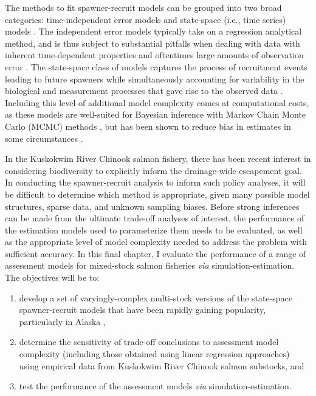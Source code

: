 \documentclass[12pt,]{book}
\theoremstyle{definition}
\theoremstyle{definition}
\theoremstyle{definition}
\theoremstyle{remark}
\begin{document}
The methods to fit spawner-recruit models can be grouped into two broad
categories: time-independent error models
\citep[i.e.,][]{clark-etal-2009} and state-space (i.e., time series)
models \citep{fleischman-etal-2013, su-peterman-2012}. The independent
error models typically take on a regression analytical method, and is
thus subject to substantial pitfalls when dealing with data with
inherent time-dependent properties and oftentimes large amounts of
observation error \citep{walters-martell-2004}. The state-space class of
models captures the process of recruitment events leading to future
spawners while simultaneously accounting for variability in the
biological and measurement processes that gave rise to the observed data
\citep{devalpine-hastings-2002, fleischman-etal-2013}. Including this
level of additional model complexity comes at computational costs, as
these models are well-suited for Bayesian inference with Markov Chain
Monte Carlo (MCMC) methods \citep[Ch. 4]{newman-etal-2014}, but has been
shown to reduce bias in estimates in some circumstances
\citep{su-peterman-2012, walters-martell-2004}.

In the Kuskokwim River Chinook salmon fishery, there has been recent
interest in considering biodiversity to explicitly inform the
drainage-wide escapement goal. In conducting the spawner-recruit
analysis to inform such policy analyses, it will be difficult to
determine which method is appropriate, given many possible model
structures, sparse data, and unknown sampling biases. Before strong
inferences can be made from the ultimate trade-off analyses of interest,
the performance of the estimation models used to parameterize them needs
to be evaluated, as well as the appropriate level of model complexity
needed to address the problem with sufficient accuracy. In this final
chapter, I evaluate the performance of a range of assessment models for
mixed-stock salmon fisheries \emph{via} simulation-estimation. The
objectives will be to:

\begin{enumerate}
\def\labelenumi{(\arabic{enumi})}
\item
  develop a set of varyingly-complex multi-stock versions of the
  state-space spawner-recruit models that have been rapidly gaining
  popularity, particularly in Alaska
  \citep{walters-martell-2004, su-peterman-2012, fleischman-etal-2013, staton-etal-2017-intseq},
\item
  determine the sensitivity of trade-off conclusions to assessment model
  complexity (including those obtained using linear regression
  approaches) using empirical data from Kuskokwim River Chinook salmon
  substocks, and
\item
  test the performance of the assessment models \emph{via}
  simulation-estimation.
\end{enumerate}
\end{document}
